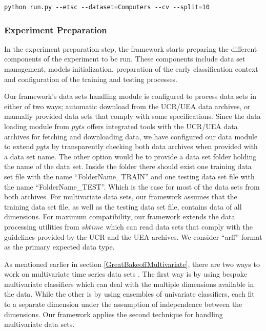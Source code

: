 \lstset{basicstyle=\ttfamily\small}
\begin{lstlisting}[language=Comsol,caption={Sample command for providing user input to the framework},captionpos=b,label={ListingUserInput}]
  python run.py --etsc --dataset=Computers --cv --split=10
\end{lstlisting}

\subsubsection{Experiment Preparation}
\label{SubsectionExperimentPreparation}
In the experiment preparation step, the framework starts preparing the different components of the experiment to be run.
These components include data set management, models initialization, preparation of the early classification context
and configuration of the training and testing processes.

Our framework's data sets handling module is configured to process data sets in either of two ways; automatic download from the UCR/UEA data archives,
or manually provided data sets that comply with some specifications.
Since the data loading module from $pyts$ \cite{JMLR:v21:19-763} offers integrated tools with the UCR/UEA data archives for fetching and downloading data,
we have configured our data module to extend $pyts$ by transparently checking both data archives when provided with a data set name.
The other option would be to provide a data set folder holding the name of the data set.
Inside the folder there should exist one training data set file with the name \enquote{FolderName\_TRAIN} and one testing data set file with the name \enquote{FolderName\_TEST}.
Which is the case for most of the data sets from both archives.
For multivariate data sets, our framework assumes that the training data set file, as well as the testing data set file, contains data of all dimensions.
For maximum compatibility, our framework extends the data processing utilities from $sktime$ \cite{loning2019sktime}
which can read data sets that comply with the guidelines provided by the UCR and the UEA archives.
We consider \enquote{arff} format as the primary expected data type.

As mentioned earlier in section \ref{GreatBakeoffMultivariate}, there are two ways to work on multivariate time series data sets \cite{ruiz2020great}.
The first way is by using bespoke multivariate classifiers which can deal with the multiple dimensions available in the data.
While the other is by using ensembles of univariate classifiers, each fit to a separate dimension under the assumption of independence between the dimensions.
Our framework applies the second technique for handling multivariate data sets.

